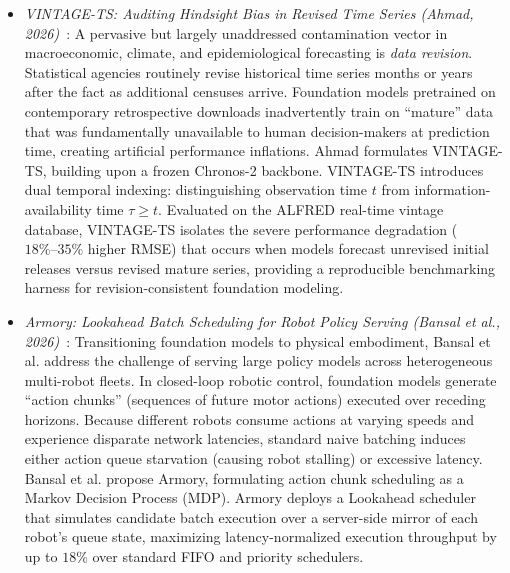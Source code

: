 \begin{itemize}[leftmargin=*]
    \item \emph{VINTAGE-TS: Auditing Hindsight Bias in Revised Time Series (Ahmad, 2026)}~\cite{ahmad2026vintagets}: A pervasive but largely unaddressed contamination vector in macroeconomic, climate, and epidemiological forecasting is \emph{data revision}. Statistical agencies routinely revise historical time series months or years after the fact as additional censuses arrive. Foundation models pretrained on contemporary retrospective downloads inadvertently train on ``mature'' data that was fundamentally unavailable to human decision-makers at prediction time, creating artificial performance inflations. Ahmad formulates VINTAGE-TS, building upon a frozen Chronos-2 backbone. VINTAGE-TS introduces dual temporal indexing: distinguishing observation time $t$ from information-availability time $\tau \ge t$. Evaluated on the ALFRED real-time vintage database, VINTAGE-TS isolates the severe performance degradation ($18\%\text{--}35\%$ higher RMSE) that occurs when models forecast unrevised initial releases versus revised mature series, providing a reproducible benchmarking harness for revision-consistent foundation modeling.

    \item \emph{Armory: Lookahead Batch Scheduling for Robot Policy Serving (Bansal et al., 2026)}~\cite{bansal2026armory}: Transitioning foundation models to physical embodiment, Bansal et al. address the challenge of serving large policy models across heterogeneous multi-robot fleets. In closed-loop robotic control, foundation models generate ``action chunks'' (sequences of future motor actions) executed over receding horizons. Because different robots consume actions at varying speeds and experience disparate network latencies, standard naive batching induces either action queue starvation (causing robot stalling) or excessive latency. Bansal et al. propose Armory, formulating action chunk scheduling as a Markov Decision Process (MDP). Armory deploys a Lookahead scheduler that simulates candidate batch execution over a server-side mirror of each robot's queue state, maximizing latency-normalized execution throughput by up to $18\%$ over standard FIFO and priority schedulers.
\end{itemize}


